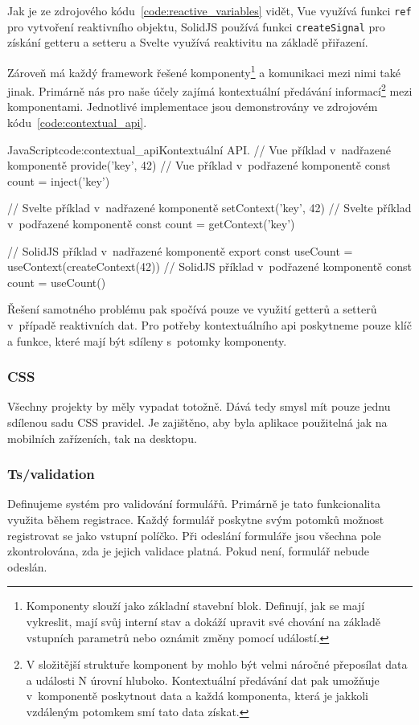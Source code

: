 \documentclass[
  master,
  program=ainf,
  tables=false,
  sourcecodes,
  glossaries,
  index
]{kidiplom}
\begin{document}
Jak je ze zdrojového kódu~\ref{code:reactive_variables} vidět, Vue \cite{vue} využívá funkci
{\tt ref} pro vytvoření reaktivního objektu,
SolidJS \cite{solidjs} používá funkci {\tt createSignal} pro získání getteru a setteru a Svelte \cite{svelte}
využívá reaktivitu na základě přiřazení. 

Zároveň má každý framework řešené komponenty\footnote{Komponenty slouží jako
  základní stavební blok. Definují, jak se mají vykreslit, mají svůj interní
  stav a dokáží upravit své chování na základě vstupních parametrů nebo
  oznámit změny pomocí událostí.} a komunikaci mezi nimi také jinak. Primárně
nás pro naše účely zajímá kontextuální předávání informací\footnote{V
  složitější struktuře komponent by mohlo být velmi náročné přeposílat data a
  události N úrovní hluboko. Kontextuální předávání dat pak umožňuje
v~komponentě poskytnout data a každá komponenta, která je jakkoli vzdáleným
  potomkem smí tato data získat.} mezi komponentami. Jednotlivé implementace 
  jsou demonstrovány ve zdrojovém kódu~\ref{code:contextual_api}.

  \begin{kicode}{JavaScript}{code:contextual_api}{Kontextuální API.}
  // Vue příklad v~nadřazené komponentě
  provide('key', 42)
  // Vue příklad v~podřazené komponentě
  const count = inject('key')

  // Svelte příklad v~nadřazené komponentě
  setContext('key', 42)
  // Svelte příklad v~podřazené komponentě
  const count = getContext('key')

  // SolidJS příklad v~nadřazené komponentě
  export const useCount = useContext(createContext(42))
  // SolidJS příklad v~podřazené komponentě
  const count = useCount()
\end{kicode}

Řešení samotného problému pak spočívá pouze ve využití getterů a setterů
v~případě reaktivních dat. Pro potřeby kontextuálního api poskytneme pouze klíč a
funkce, které mají být sdíleny s~potomky komponenty.

\subsubsection{CSS}
Všechny projekty by měly vypadat totožně. Dává tedy smysl mít pouze jednu
sdílenou sadu CSS pravidel. Je zajištěno, aby byla aplikace použitelná jak na
mobilních zařízeních, tak na desktopu.

\subsubsection{Ts/validation}
Definujeme systém pro validování formulářů. Primárně je tato funkcionalita
využita během registrace. Každý formulář poskytne svým potomků možnost
registrovat se jako vstupní políčko. Při odeslání formuláře jsou všechna pole
zkontrolována, zda je jejich validace platná. Pokud není, formulář nebude
odeslán.
\end{document}
